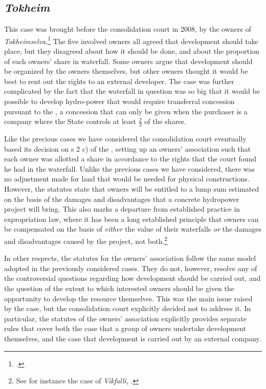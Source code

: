 \subsection{\emph{Tokheim}}

This case was brought before the consolidation court in 2008, by the owners of \emph{Tokheimselva}.\footcite{tokheim08} The five involved owners all agreed that development should take place, but they disagreed about how it should be done, and about the proportion of each owners' share in waterfall. Some owners argue that development should be organized by the owners themselves, but other owners thought it would be best to rent out the rights to an external developer. The case was further complicated by the fact that the waterfall in question was so big that it would be possible to develop hydro-power that would require transferral concession pursuant to the \cite{ica17}, a concession that can only be given when the purchaser is a company where the State controls at least $\frac{2}{3}$ of the shares. 

Like the precious cases we have considered the consolidation court eventually based its decision on s 2 c) of the \cite{lca79}, setting up an owners' association such that each owner was allotted a share in accordance to the rights that the court found he had in the waterfall. Unlike the previous cases we have considered, there was no adjustment made for land that would be needed for physical constructions. However, the statutes state that owners will be entitled to a lump sum estimated on the basis of the damages and disadvantages that a concrete hydropower project will bring. This also marks a departure from established practice in expropriation law, where it has been a long established principle that owners can be compensated on the basis of \emph{either} the value of their waterfalls \emph{or} the damages and disadvantages caused by the project, not both.\footnote{See for instance the case of \emph{Vikfalli}, \cite{vikfalli71}.} 

In other respects, the statutes for the owners' association follow the same model adopted in the previously considered cases. They do not, however, resolve any of the controversial questions regarding how development should be carried out, and the question of the extent to which interested owners should be given the opportunity to develop the resource themselves. This was the main issue raised by the case, but the consolidation court explicitly decided not to address it. In particular, the statutes of the owners' association explicitly provides separate rules that cover both the case that a group of owners undertake development themselves, and the case that development is carried out by an external company. 


